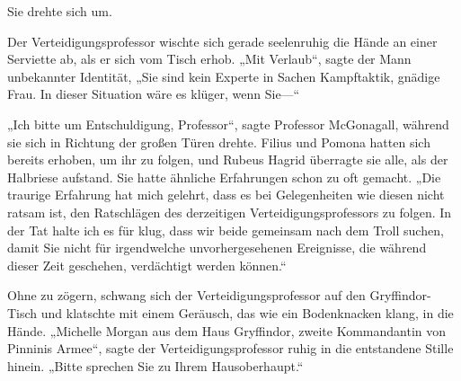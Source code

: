 Sie drehte sich um.

Der Verteidigungsprofessor wischte sich gerade seelenruhig die Hände an einer Serviette ab, als er sich vom Tisch erhob.
„Mit Verlaub“, sagte der Mann unbekannter Identität,
„Sie sind kein Experte in Sachen Kampftaktik, gnädige Frau. In dieser Situation wäre es klüger, wenn Sie—“

„Ich bitte um Entschuldigung, Professor“, sagte Professor McGonagall, während sie sich in Richtung der großen Türen drehte. Filius und Pomona hatten sich bereits erhoben, um ihr zu folgen, und Rubeus Hagrid überragte sie alle, als der Halbriese aufstand. Sie hatte ähnliche Erfahrungen schon zu oft gemacht.
„Die traurige Erfahrung hat mich gelehrt, dass es bei Gelegenheiten wie diesen nicht ratsam ist, den Ratschlägen des derzeitigen Verteidigungsprofessors zu folgen. In der Tat halte ich es für klug, dass wir beide gemeinsam nach dem Troll suchen, damit Sie nicht für irgendwelche unvorhergesehenen Ereignisse, die während dieser Zeit geschehen, verdächtigt werden können.“


Ohne zu zögern, schwang sich der Verteidigungsprofessor auf den Gryffindor-Tisch und klatschte mit einem Geräusch, das wie ein Bodenknacken klang, in die Hände.
„Michelle Morgan aus dem Haus Gryffindor, zweite Kommandantin von Pinninis Armee“, sagte der Verteidigungsprofessor ruhig in die entstandene Stille hinein.
„Bitte sprechen Sie zu Ihrem Hausoberhaupt.“

